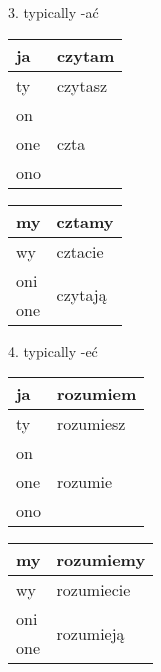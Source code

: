 \documentclass[10pt,twoside]{../filofax2}
\begin{document}
\begin{ffpage}{}
3. typically -ać\\
\begin{tabular}{|m{0.5cm}|m{2.25cm}|}
	\hline
	ja&czytam\\\hline
	ty&czytasz\\\hline
	on&\\
	one&czta\\
	ono& \\\hline
\end{tabular}

\begin{tabular}{|m{0.5cm}|m{2.25cm}|}
	\hline
	my &cztamy\\\hline
	wy &cztacie\\\hline
	oni&\multirow{2}{*}{czytają}\\
	one&\\\hline
\end{tabular}

\vspace{1cm}
4. typically -eć\\
\begin{tabular}{|m{0.5cm}|m{2.25cm}|}
	\hline
	ja&rozumiem\\\hline
	ty&rozumiesz\\\hline
	on&\multirow{3}{*}{rozumie}\\
	one&\\
	ono& \\\hline
\end{tabular}
\begin{tabular}{|m{0.5cm}|m{2.25cm}|}
	\hline
	my &rozumiemy\\\hline
	wy &rozumiecie\\\hline
	oni&\multirow{2}{*}{rozumieją}\\
	one&\\\hline
\end{tabular}
\end{ffpage}
\end{document}
